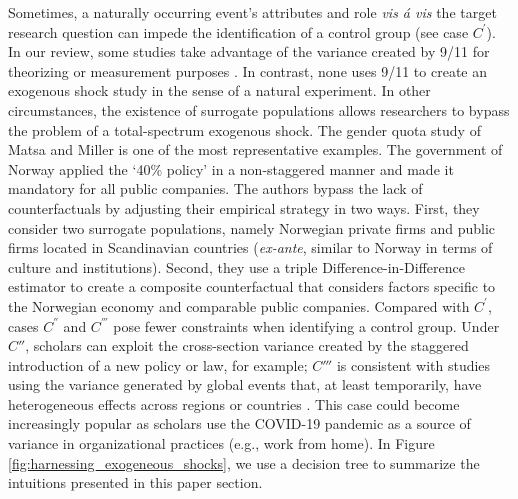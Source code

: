 \documentclass[11pt]{article}
\begin{document}
\begin{refsection}
Sometimes, a naturally occurring event's attributes and role \textit{vis \'a vis} the target research question can impede the identification of a control group (see case $C^{'}$). In our review, some studies take advantage of the variance created by 9/11 for theorizing \autocite{corbo2016323} or measurement purposes \autocite{vergne20121027}.  In contrast, none uses 9/11 to create an exogenous shock study in the sense of a natural experiment. In other circumstances, the existence of surrogate populations allows researchers to bypass the problem of a total-spectrum exogenous shock. The gender quota study of Matsa and Miller  \autocite*{matsa_miller_2013} is one of the most representative examples.  The government of Norway applied the `40\% policy' in a non-staggered manner and made it mandatory for all public companies. The authors bypass the lack of counterfactuals by adjusting their empirical strategy in two ways. First, they consider two surrogate populations, namely Norwegian private firms and public firms located in Scandinavian countries (\textit{ex-ante}, similar to Norway in terms of culture and institutions).  Second, they use a triple Difference-in-Difference estimator to create a composite counterfactual that considers factors specific to the Norwegian economy and comparable public companies. Compared with $C^{'}$, cases $C^{''}$ and $C^{'''}$ pose fewer constraints when identifying a control group. Under $C{''}$, scholars can exploit the cross-section variance created by the staggered introduction of a new policy or law, for example; $C{'''}$ is consistent with studies using the variance generated by global events that, at least temporarily, have heterogeneous effects across regions or countries  \autocite[e.g.,][]{garretsen2022}. This case could become increasingly popular as scholars use the COVID-19 pandemic as a source of variance in organizational practices (e.g., work from home). In Figure \ref{fig:harnessing_exogeneous_shocks}, we use a decision tree to summarize the intuitions presented in this paper section. 


\end{refsection}
\end{document}
